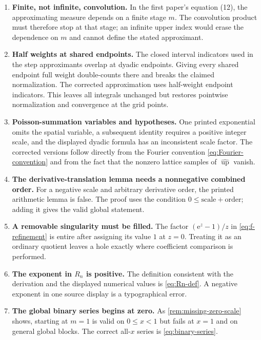 \documentclass[11pt]{article}
\numberwithin{equation}{section}
\theoremstyle{definition}
\theoremstyle{remark}
\newcommand{\upf}{\operatorname{up}}
\newcommand{\e}{\mathrm e}
\begin{document}
\begin{enumerate}[label=\textbf{\arabic*.},leftmargin=*]
\item \textbf{Finite, not infinite, convolution.}
In the first paper's equation (12), the approximating measure depends on a
finite stage $m$.  The convolution product must therefore stop at that stage;
an infinite upper index would erase the dependence on $m$ and cannot define
the stated approximant.

\item \textbf{Half weights at shared endpoints.}
The closed interval indicators used in the step approximants overlap at
dyadic endpoints.  Giving every shared endpoint full weight double-counts
there and breaks the claimed normalization.  The corrected approximation
uses half-weight endpoint indicators.  This leaves all integrals unchanged
but restores pointwise normalization and convergence at the grid points.

\item \textbf{Poisson-summation variables and hypotheses.}
One printed exponential omits the spatial variable, a subsequent identity
requires a positive integer scale, and the displayed dyadic formula has an
inconsistent scale factor.  The corrected versions follow directly from the
Fourier convention \eqref{eq:Fourier-convention} and from the fact that the
nonzero lattice samples of $\widehat{\upf}$ vanish.

\item \textbf{The derivative-translation lemma needs a nonnegative combined
order.}
For a negative scale and arbitrary derivative order, the printed arithmetic
lemma is false.  The proof uses the condition
$0\le \text{scale}+\text{order}$; adding it gives the valid global statement.

\item \textbf{A removable singularity must be filled.}
The factor $(\e^z-1)/z$ in \eqref{eq:f-refinement} is entire after assigning
its value $1$ at $z=0$.  Treating it as an ordinary quotient leaves a hole
exactly where coefficient comparison is performed.

\item \textbf{The exponent in $R_n$ is positive.}
The definition consistent with the derivation and the displayed numerical
values is \eqref{eq:Rn-def}.  A negative exponent in one source display is a
typographical error.

\item \textbf{The global binary series begins at zero.}
As \cref{rem:missing-zero-scale} shows, starting at $m=1$ is valid on
$0\le x<1$ but fails at $x=1$ and on general global blocks.  The correct
all-$x$ series is \eqref{eq:binary-series}.


\end{enumerate}
\end{document}
